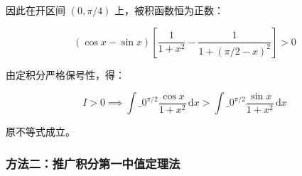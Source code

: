 \documentclass[11pt,a4paper,UTF8]{ctexart}
\begin{document}
\begin{solbox}[分步推导与答题规范]
因此在开区间 $(0, \pi/4)$ 上，被积函数恒为正数：

\begin{equation*}
(\cos x - \sin x) \left[ \frac{1}{1+x^2} - \frac{1}{1+(\pi/2 - x)^2} \right] > 0
\end{equation*}

由定积分严格保号性，得：

\begin{equation*}
I > 0 \implies \int\_0^{\pi/2} \frac{\cos x}{1+x^2}\,\mathrm{d}x > \int\_0^{\pi/2} \frac{\sin x}{1+x^2}\,\mathrm{d}x
\end{equation*}

原不等式成立。
\end{solbox}


\subsubsection{方法二：推广积分第一中值定理法}
\end{document}
